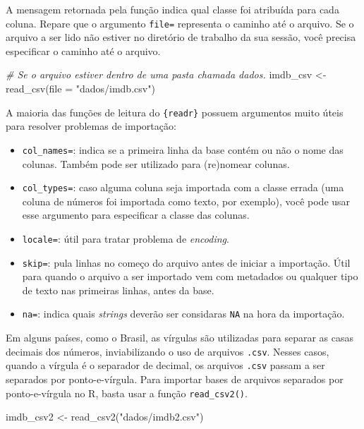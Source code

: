 \documentclass[
]{book}
\newenvironment{Shaded}{\begin{snugshade}}{\end{snugshade}}
\newcommand{\AttributeTok}[1]{\textcolor[rgb]{0.77,0.63,0.00}{#1}}
\newcommand{\CommentTok}[1]{\textcolor[rgb]{0.56,0.35,0.01}{\textit{#1}}}
\newcommand{\FunctionTok}[1]{\textcolor[rgb]{0.00,0.00,0.00}{#1}}
\newcommand{\NormalTok}[1]{#1}
\newcommand{\OtherTok}[1]{\textcolor[rgb]{0.56,0.35,0.01}{#1}}
\newcommand{\StringTok}[1]{\textcolor[rgb]{0.31,0.60,0.02}{#1}}
\begin{document}
A mensagem retornada pela função indica qual classe foi atribuída para cada coluna. Repare que o argumento \texttt{file=} representa o caminho até o arquivo. Se o arquivo a ser lido não estiver no diretório de trabalho da sua sessão, você precisa especificar o caminho até o arquivo.

\begin{Shaded}
\begin{Highlighting}[]
\CommentTok{\# Se o arquivo estiver dentro de uma pasta chamada dados.}
\NormalTok{imdb\_csv }\OtherTok{\textless{}{-}} \FunctionTok{read\_csv}\NormalTok{(}\AttributeTok{file =} \StringTok{"dados/imdb.csv"}\NormalTok{)}
\end{Highlighting}
\end{Shaded}

A maioria das funções de leitura do \texttt{\{readr\}} possuem argumentos muito úteis para resolver problemas de importação:

\begin{itemize}
\item
  \texttt{col\_names=}: indica se a primeira linha da base contém ou não o nome das colunas. Também pode ser utilizado para (re)nomear colunas.
\item
  \texttt{col\_types=}: caso alguma coluna seja importada com a classe errada (uma coluna de números foi importada como texto, por exemplo), você pode usar esse argumento para especificar a classe das colunas.
\item
  \texttt{locale=}: útil para tratar problema de \emph{encoding}.
\item
  \texttt{skip=}: pula linhas no começo do arquivo antes de iniciar a importação. Útil para quando o arquivo a ser importado vem com metadados ou qualquer tipo de texto nas primeiras linhas, antes da base.
\item
  \texttt{na=}: indica quais \emph{strings} deverão ser considaras \texttt{NA} na hora da importação.
\end{itemize}

Em alguns países, como o Brasil, as vírgulas são utilizadas para separar as casas decimais dos números, inviabilizando o uso de arquivos \texttt{.csv}. Nesses casos, quando a vírgula é o separador de decimal, os arquivos \texttt{.csv} passam a ser separados por ponto-e-vírgula. Para importar bases de arquivos separados por ponto-e-vírgula no R, basta usar a função \texttt{read\_csv2()}.

\begin{Shaded}
\begin{Highlighting}[]
\NormalTok{imdb\_csv2 }\OtherTok{\textless{}{-}} \FunctionTok{read\_csv2}\NormalTok{(}\StringTok{"dados/imdb2.csv"}\NormalTok{)}
\end{Highlighting}
\end{Shaded}
\end{document}
